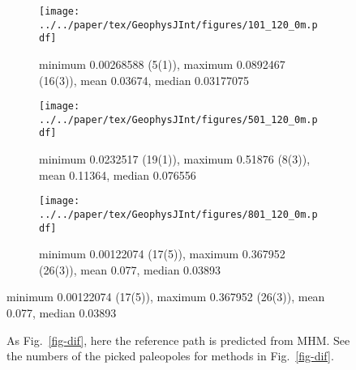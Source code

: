 \begin{figure}[tbp]
  \captionsetup[subfigure]{aboveskip=2pt,belowskip=-3pt}
  \centering
  \begin{subfigure}{.99\textwidth}
    \texttt{[image: ../../paper/tex/GeophysJInt/figures/101\_120\_0m.pdf]}
    \caption{minimum 0.00268588 (5(1)),
    maximum 0.0892467 (16(3)), mean 0.03674, median 0.03177075}\label{fig-na-difm}
  \end{subfigure}
  \vspace{.1em}
  \begin{subfigure}{.99\textwidth}
    \texttt{[image: ../../paper/tex/GeophysJInt/figures/501\_120\_0m.pdf]}
    \caption{minimum 0.0232517 (19(1)), maximum 0.51876 (8(3)),
    mean 0.11364, median 0.076556}\label{fig-in-difm}
  \end{subfigure}
  \vspace{.1em}
  \begin{subfigure}{.99\textwidth}
    \texttt{[image: ../../paper/tex/GeophysJInt/figures/801\_120\_0m.pdf]}
    \caption{minimum 0.00122074 (17(5)), maximum
    0.367952 (26(3)), mean 0.077, median 0.03893}\label{fig-au-difm}
  \end{subfigure}
\end{figure}
\begin{figure}[!ht]
  \ContinuedFloat\caption[$\mathcal{CPD}$ of each plate's paleomagnetic APWPs vs
    its MHM predicted APWP]{As Fig.~\ref{fig-dif}, here the reference path is
    predicted from MHM\@. See the numbers of the picked paleopoles for methods
    in Fig.~\ref{fig-dif}.}\label{fig-difm}
\end{figure}

